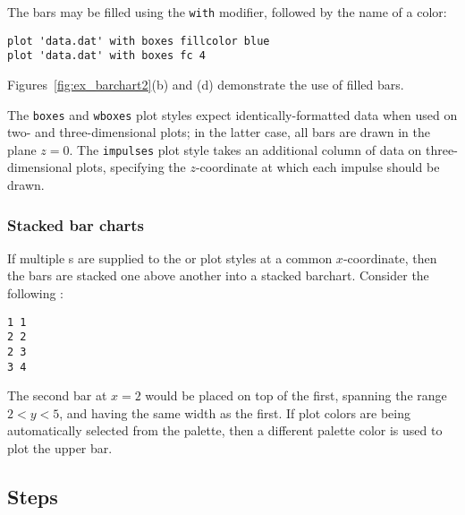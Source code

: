 The bars may be filled using the {\tt with}  modifier,
followed by the name of a color:

\begin{verbatim}
plot 'data.dat' with boxes fillcolor blue
plot 'data.dat' with boxes fc 4
\end{verbatim}

\noindent Figures~\ref{fig:ex_barchart2}(b) and (d) demonstrate the use of
filled bars.

The {\tt boxes} and {\tt wboxes} plot styles expect identically-formatted data
when used on two- and three-dimensional plots; in the latter case, all bars are
drawn in the plane $z=0$. The {\tt impulses} plot style takes an additional
column of data on three-dimensional plots, specifying the $z$-coordinate at
which each impulse should be drawn.

\subsubsection{Stacked bar charts}

If multiple \datapoint s are supplied to the  or 
plot styles at a common $x$-coordinate, then the bars are stacked one above
another into a stacked barchart. Consider the following \datafile:

\begin{verbatim}
1 1
2 2
2 3
3 4
\end{verbatim}

\noindent The second bar at $x=2$ would be placed on top of the first, spanning
the range $2<y<5$, and having the same width as the first. If plot colors are
being automatically selected from the palette, then a different palette color
is used to plot the upper bar.

\subsection{Steps}

